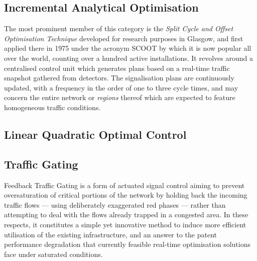\subsection{Incremental Analytical Optimisation}
The most prominent member of this category is the \emph{Split Cycle and Offset Optimisation Technique} developed for research purposes in Glasgow, and first applied there in 1975 under the acronym SCOOT by which it is now popular all over the world, counting over a hundred active installations.
It revolves around a centralised control unit which generates plans based on a real-time traffic snapshot gathered from detectors. The signalisation plans are continuously updated, with a frequency in the order of one to three cycle times, and may concern the entire network or \emph{regions} thereof which are expected to feature homogeneous traffic conditions.\\


\subsection{Linear Quadratic Optimal Control}

\subsection{Traffic Gating}

Feedback Traffic Gating is a form of actuated signal control aiming to prevent oversaturation of critical portions of the network by holding back the incoming traffic flows — using deliberately exaggerated red phases — rather than attempting to deal with the flows already trapped in a congested area. In these respects, it constitutes a simple yet innovative method to induce more efficient utilisation of the existing infrastructure, and an answer to the patent performance degradation that currently feasible real-time optimisation solutions face under saturated conditions.

\subsubsection*{}

\subsubsection*{}


